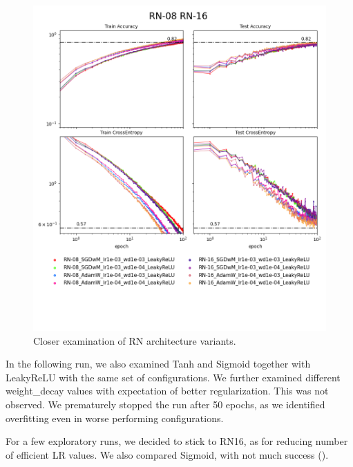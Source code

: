 \documentclass[12pt,a4paper]{article}
\begin{document}
\begin{figure}[H]
  \includegraphics[width=\textwidth, trim={0, 3.5cm, 0, 0}, clip]{../logsRN.png}
  \caption{Closer examination of RN architecture variants.}
\end{figure}

In the following run, we also examined Tanh and Sigmoid together with LeakyReLU with the same
set of configurations. We further examined different 
weight\_decay values with expectation of better regularization.
This was not observed. We prematurely stopped the run after 50 epochs,
as we identified overfitting even in worse performing configurations.

For a few exploratory runs, we decided to stick to RN16, as for reducing
number of efficient LR values. We also compared Sigmoid, with not much
success ().
\end{document}
